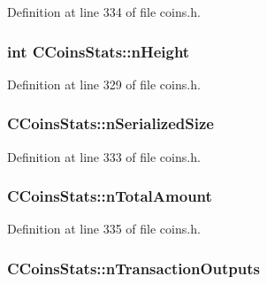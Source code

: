 Definition at line 334 of file coins.\+h.

\hypertarget{struct_c_coins_stats_a5972700c4733ce02e12530d758e95d8c}{}
\subsubsection[{n\+Height}]{\setlength{\rightskip}{0pt plus 5cm}int C\+Coins\+Stats\+::n\+Height}\label{struct_c_coins_stats_a5972700c4733ce02e12530d758e95d8c}


Definition at line 329 of file coins.\+h.

\hypertarget{struct_c_coins_stats_ac4302ffc2f8be6e62dbc5655f77e4202}{}
\subsubsection[{n\+Serialized\+Size}]{ C\+Coins\+Stats\+::n\+Serialized\+Size}\label{struct_c_coins_stats_ac4302ffc2f8be6e62dbc5655f77e4202}


Definition at line 333 of file coins.\+h.

\hypertarget{struct_c_coins_stats_a97c76344c650e55377d5f9246a906cc4}{}
\subsubsection[{n\+Total\+Amount}]{ C\+Coins\+Stats\+::n\+Total\+Amount}\label{struct_c_coins_stats_a97c76344c650e55377d5f9246a906cc4}


Definition at line 335 of file coins.\+h.

\hypertarget{struct_c_coins_stats_a02612be210ba7c628d04ddedd83b9ff0}{}
\subsubsection[{n\+Transaction\+Outputs}]{ C\+Coins\+Stats\+::n\+Transaction\+Outputs}\label{struct_c_coins_stats_a02612be210ba7c628d04ddedd83b9ff0}


